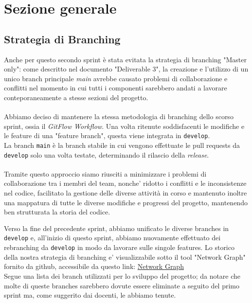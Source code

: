 \documentclass{article}
\begin{document}
\clearpage

\section{Sezione generale}

\subsection{Strategia di Branching}
Anche per questo secondo sprint è stata evitata la strategia di branching "Master only": come descritto nel documento "Deliverable 3", la creazione e l'utilizzo di un unico branch principale \textit{main} avrebbe causato problemi di collaborazione e conflitti nel momento in cui tutti i componenti sarebbero andati a lavorare conteporaneamente a stesse sezioni del progetto.\\\\
\noindent
Abbiamo deciso di mantenere la stessa metodologia di branching dello scorso sprint, ossia il \textit{GitFlow Workflow}. Una volta ritenute soddisfacenti le modifiche e le feature di una "feature branch", questa viene integrata in \texttt{develop}.\\
La branch \texttt{main} è la branch stabile in cui vengono effettuate le pull requests da \texttt{develop} solo una volta testate, determinando il rilascio della \textit{release}.\\\\

\noindent
Tramite questo approccio siamo riusciti a minimizzare i problemi di  collaborazione tra i membri del team, nonche' ridotto i conflitti e le inconsistenze nel codice, facilitato la gestione delle diverse attività in corso e mantenuto inoltre una mappatura di tutte le diverse modifiche e progressi del progetto, mantenendo ben strutturata la storia del codice.

\noindent
Verso la fine del precedente sprint, abbiamo unificato le diverse branches in \texttt{develop} e, all'inizio di questo sprint, abbiamo nuovamente effettuato dei rebranching da \texttt{develop} in modo da lavorare sulle singole features.
Lo storico della nostra strategia di branching e' visualizzabile sotto il tool "Network Graph" fornito da github, accessibile da questo link:
\href{https://github.com/ELI20ZIVI/BeeLive/network}{Network Graph}\\

\noindent
Segue una lista dei branch utilizzati per lo sviluppo del progetto; da notare che molte di queste branches sarebbero dovute essere eliminate a seguito del primo sprint ma, come suggerito dai docenti, le abbiamo tenute.
\end{document}
